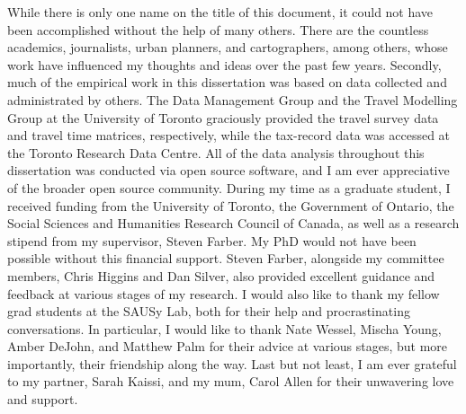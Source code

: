 \documentclass[11 pt, letterpaper]{report}
\begin{document}
While there is only one name on the title of this document, it could not have been accomplished without the help of many others. There are the countless academics, journalists, urban planners, and cartographers, among others, whose work have influenced my thoughts and ideas over the past few years. Secondly, much of the empirical work in this dissertation was based on data collected and administrated by others. The Data Management Group and the Travel Modelling Group at the University of Toronto graciously provided the travel survey data and travel time matrices, respectively, while the tax-record data was accessed at the Toronto Research Data Centre. All of the data analysis throughout this dissertation was conducted via open source software, and I am ever appreciative of the broader open source community. During my time as a graduate student, I received funding from the University of Toronto, the Government of Ontario, the Social Sciences and Humanities Research Council of Canada, as well as a research stipend from my supervisor, Steven Farber. My PhD would not have been possible without this financial support. Steven Farber, alongside my committee members, Chris Higgins and Dan Silver, also provided excellent guidance and feedback at various stages of my research. I would also like to thank my fellow grad students at the SAUSy Lab, both for their help and procrastinating conversations. In particular, I would like to thank Nate Wessel, Mischa Young, Amber DeJohn, and Matthew Palm for their advice at various stages, but more importantly, their friendship along the way. Last but not least, I am ever grateful to my partner, Sarah Kaissi, and my mum, Carol Allen for their unwavering love and support.


%
%
%

% 
%
%
%
%
%


\newpage





\tableofcontents


\newpage







\listoffigures
\end{document}

